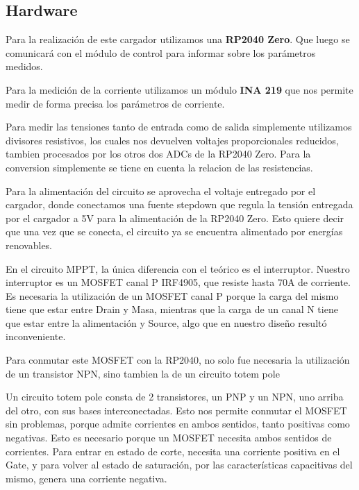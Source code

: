             \subsection{Hardware}
                Para la realización de este cargador utilizamos una \textbf{RP2040 Zero}. Que luego se comunicará con el módulo de control para informar sobre los parámetros medidos.\par
                Para la medición de la corriente utilizamos un módulo \textbf{INA 219} que nos permite medir de forma precisa los parámetros de corriente.\par
                Para medir las tensiones tanto de entrada como de salida simplemente utilizamos divisores resistivos, los cuales nos devuelven voltajes proporcionales reducidos, tambien procesados por los otros dos ADCs de la RP2040 Zero. Para la conversion simplemente se tiene en cuenta la relacion de las resistencias.\par
                Para la alimentación del circuito se aprovecha el voltaje entregado por el cargador, donde conectamos una fuente stepdown que regula la tensión entregada por el cargador a 5V para la alimentación de la RP2040 Zero. Esto quiere decir que una vez que se conecta, el circuito ya se encuentra alimentado por energías renovables.\par
                En el circuito MPPT, la única diferencia con el teórico es el interruptor. Nuestro interruptor es un MOSFET canal P IRF4905, que resiste hasta 70A de corriente. Es necesaria la utilización de un MOSFET canal P porque la carga del mismo tiene que estar entre Drain y Masa, mientras que la carga de un canal N tiene que estar entre la alimentación y Source, algo que en nuestro diseño resultó inconveniente.\par
                Para conmutar este MOSFET con la RP2040, no solo fue necesaria la utilización de un transistor NPN, sino tambien la de un circuito totem pole\par
                Un circuito totem pole consta de 2 transistores, un PNP y un NPN, uno arriba del otro, con sus bases interconectadas. Esto nos permite conmutar el MOSFET sin problemas, porque admite corrientes en ambos sentidos, tanto positivas como negativas. Esto es necesario porque un MOSFET necesita ambos sentidos de corrientes. Para entrar en estado de corte, necesita una corriente positiva en el Gate, y para volver al estado de saturación, por las características capacitivas del mismo, genera una corriente negativa.\par
